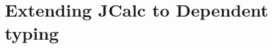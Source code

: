\chapter{Extending JCalc to Dependent typing}
\newcommand{\Turn}[2]
{ {#1}\vdash_{\textbf{\sf IPC}}  {#2}}
\newcommand{\TurnTwo}[2]
{ {#1}\vdash_{\textbf{\sf J}}  {#2}}
\newcommand{\TurnT}[2]
{ \Delta_0;{#1}\vdash  {#2}}
\newcommand{\TurnTT}[2]
{ \Delta_0;{#1}\vdash_{\sf JC_1}  {#2}}
\newcommand{\Turnj}[1]
{ \Delta_0\vdash_{\sf J_0}  {#1}}
\newcommand{\Turnjc}[3]
{ {#1};{#2}\vdash_{\textbf{\sf JC}}  {#3}}


